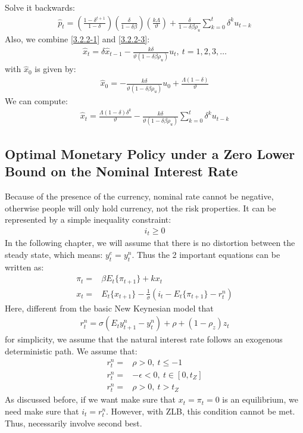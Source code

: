 \documentclass{article}
\numberwithin{equation}{section}
\begin{document}
Solve it backwards:
	\begin{align}
		\hat{p}_t = \left( \frac{1 - \delta^{t+1}}{1 - \delta} \right) \left( \frac{\delta}{1 - \delta\beta} \right) \left( \frac{k\Lambda}{\vartheta} \right) + \frac{\delta}{1 - \delta\beta\rho_u} \sum\limits^t_{k=0} \delta^k u_{t-k} \label{3.2.2-4}
	\end{align}
Also, we combine \eqref{3.2.2-1} and \eqref{3.2.2-3}:
	\begin{align}
		\hat{x}_t = \delta\hat{x}_{t-1} - \frac{k\delta}{\vartheta(1 - \delta\beta\rho_u)}u_t,\ t = 1, 2, 3, \ldots \label{3.2.2-5}
	\end{align}
with $\hat{x}_0$ is given by:
	\begin{align}
		\hat{x}_0 = -\frac{k\delta}{\vartheta(1 - \delta\beta\rho_u)}u_0 + \frac{\Lambda(1 - \delta)}{\vartheta} \label{3.2.2-6}
	\end{align}
We can compute:
	\begin{align}
		\hat{x}_t = \frac{\Lambda(1 - \delta)\delta^k}{\vartheta} - \frac{k\delta}{\vartheta(1 - \delta\beta\rho_u)} \sum\limits^t_{k=0} \delta^k u_{t-k} \label{3.2.2-7}
	\end{align}


\subsection{Optimal Monetary Policy under a Zero Lower Bound on the Nominal Interest Rate}
Because of the presence of the currency, nominal rate cannot be negative, otherwise people will only hold currency, not the risk properties. It can be represented by a simple inequality constraint:
	\begin{align}
		i_t \geq 0 \label{3.3-1}
	\end{align}
In the following chapter, we will assume that there is no distortion between the steady state, which means: $y^e_t = y^n_t$. Thus the 2 important equations can be written as:
	\begin{align}
		\pi_t = &\beta E_t\{ \pi_{t+1} \} + kx_t \label{3.3-2}\\
		x_t = &E_t\{ x_{t+1} \} - \frac{1}{\sigma}(i_t - E_t\{ \pi_{t+1} \} - r^n_t) \label{3.3-3}
	\end{align}
Here, different from the basic New Keynesian model that
	\begin{align*}
		r^n_t = \sigma(E_t{y^n_{t+1}} - y^n_t) + \rho + (1 - \rho_z)z_t
	\end{align*}
for simplicity, we assume that the natural interest rate follows an exogenous deterministic path. We assume that:
	\begin{align*}
		r^n_t = &\rho > 0,\ t \leq -1\\
		r^n_t = &-\epsilon < 0,\ t \in [0, t_Z]\\
		r^n_t = &\rho > 0,\ t > t_Z 
	\end{align*} 
As discussed before, if we want make sure that $x_t = \pi_t = 0$ is an equilibrium, we need make sure that $i_t = r^n_t$. However, with ZLB, this condition cannot be met. Thus, necessarily involve second best.
\end{document}
